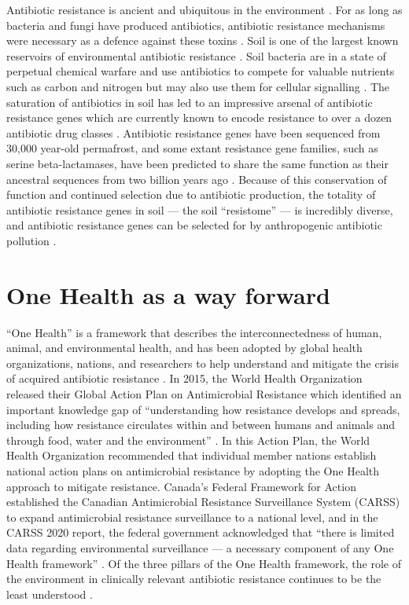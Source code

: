 Antibiotic resistance is ancient and ubiquitous in the environment \parencite{DCosta.2011, Dunivin.2019}.
For as long as bacteria and fungi have produced antibiotics, antibiotic resistance mechanisms were necessary as a defence against these toxins \parencite{Cundliffe.1989}.
Soil is one of the largest known reservoirs of environmental antibiotic resistance \parencite{Dunivin.2019}.
Soil bacteria are in a state of perpetual chemical warfare and use antibiotics to compete for valuable nutrients such as carbon and nitrogen but may also use them for cellular signalling \parencite{Traxler.2015, Fajardo.2008}.
The saturation of antibiotics in soil has led to an impressive arsenal of antibiotic resistance genes which are currently known to encode resistance to over a dozen antibiotic drug classes \parencite{Wright.2007, Dunivin.2019}.
Antibiotic resistance genes have been sequenced from 30,000 year-old permafrost, and some extant resistance gene families, such as serine beta-lactamases, have been predicted to share the same function as their ancestral sequences from two billion years ago \parencite{DCosta.2011, Hall.2004}.
Because of this conservation of function and continued selection due to antibiotic production, the totality of antibiotic resistance genes in soil --- the soil “resistome” --- is incredibly diverse, and antibiotic resistance genes can be selected for by anthropogenic antibiotic pollution \parencite{Lau.2020, Jechalke.2014}.

\section{One Health as a way forward}

“One Health” is a framework that describes the interconnectedness of human, animal, and environmental health, and has been adopted by global health organizations, nations, and researchers to help understand and mitigate the crisis of acquired antibiotic resistance \parencite{Tiedje.2019}.
In 2015, the World Health Organization released their Global Action Plan on Antimicrobial Resistance which identified an important knowledge gap of “understanding how resistance develops and spreads, including how resistance circulates within and between humans and animals and through food, water and the environment” \parencite{WorldHealthOrganization.2015}.
In this Action Plan, the World Health Organization recommended that individual member nations establish national action plans on antimicrobial resistance by adopting the One Health approach to mitigate resistance.
Canada’s Federal Framework for Action established the Canadian Antimicrobial Resistance Surveillance System (CARSS) to expand antimicrobial resistance surveillance to a national level, and in the CARSS 2020 report, the federal government acknowledged that “there is limited data regarding environmental surveillance — a necessary component of any One Health framework” \parencite{PublicHealthAgencyofCanada.2014, PublicHealthAgencyofCanada.2020}.
Of the three pillars of the One Health framework, the role of the environment in clinically relevant antibiotic resistance continues to be the least understood \parencite{Robinson.2016}.

